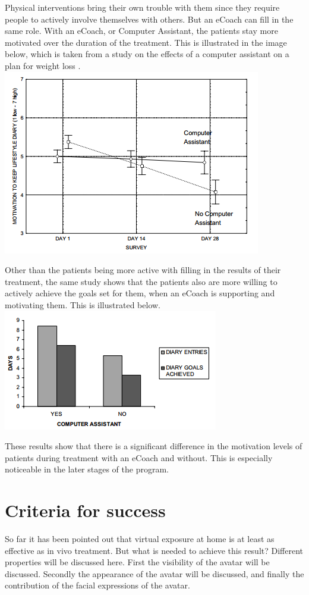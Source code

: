 \documentclass[twoside]{article}
\begin{document}
\begin{multicols}{2}
Physical interventions bring their own trouble with them since they require people to actively involve themselves with others. But an eCoach can fill in the same role. With an eCoach, or Computer Assistant, the patients stay more motivated over the duration of the treatment. This is illustrated in the image below, which is taken from a study on the effects of a computer assistant on a plan for weight loss \cite{blanson2009online}.\\
\includegraphics[scale=0.6]{Graph1.png}

Other than the patients being more active with filling in the results of their treatment, the same study shows that the patients also are more willing to actively achieve the goals set for them, when an eCoach is supporting and motivating them. This is illustrated below.\\
\includegraphics[scale=0.7]{Graph2.png}

These results show that there is a significant difference in the motivation levels of patients during treatment with an eCoach and without. This is especially noticeable in the later stages of the program.


\section{Criteria for success}
So far it has been pointed out that virtual exposure at home is at least as effective as in vivo treatment. But what is needed to achieve this result? Different properties will be discussed here. First the visibility of the avatar will be discussed. Secondly the appearance of the avatar will be discussed, and finally the contribution of the facial expressions of the avatar.


\end{multicols}
\end{document}

